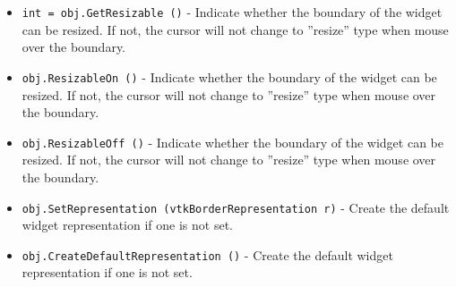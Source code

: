 \begin{itemize}
\item  \verb|int = obj.GetResizable ()| -  Indicate whether the boundary of the widget can be resized.
 If not, the cursor will not change to ''resize'' type when mouse
 over the boundary.

\item  \verb|obj.ResizableOn ()| -  Indicate whether the boundary of the widget can be resized.
 If not, the cursor will not change to ''resize'' type when mouse
 over the boundary.

\item  \verb|obj.ResizableOff ()| -  Indicate whether the boundary of the widget can be resized.
 If not, the cursor will not change to ''resize'' type when mouse
 over the boundary.

\item  \verb|obj.SetRepresentation (vtkBorderRepresentation r)| -  Create the default widget representation if one is not set. 

\item  \verb|obj.CreateDefaultRepresentation ()| -  Create the default widget representation if one is not set. 

\end{itemize}
